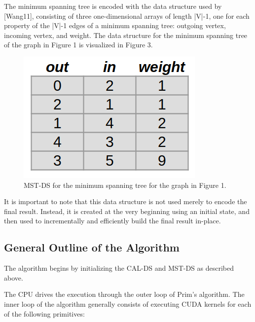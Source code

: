 \documentclass[sigconf,nonacm]{acmart}
\begin{document}
The minimum spanning tree is encoded with the data structure used by [Wang11], consisting of three one-dimensional arrays of length |V|-1, one for each property of the |V|-1 edges of a minimum spanning tree: outgoing vertex, incoming vertex, and weight. The data structure for the minimum spanning tree of the graph in Figure 1 is visualized in Figure 3.

\begin{figure}
\centering
\includegraphics[width=0.7\linewidth]{mst-datastructure}
\caption{MST-DS for the minimum spanning tree for the graph in Figure 1.}
\label{fig:mst-datastructure}
\end{figure}

It is important to note that this data structure is not used merely to encode the final result. Instead, it is created at the very beginning using an initial state, and then used to incrementally and efficiently build the final result in-place.


\subsection{General Outline of the Algorithm}

The algorithm begins by initializing the CAL-DS and MST-DS as described above.

The CPU drives the execution through the outer loop of Prim’s algorithm. The inner loop of the algorithm generally consists of executing CUDA kernels for each of the following primitives:
\end{document}
